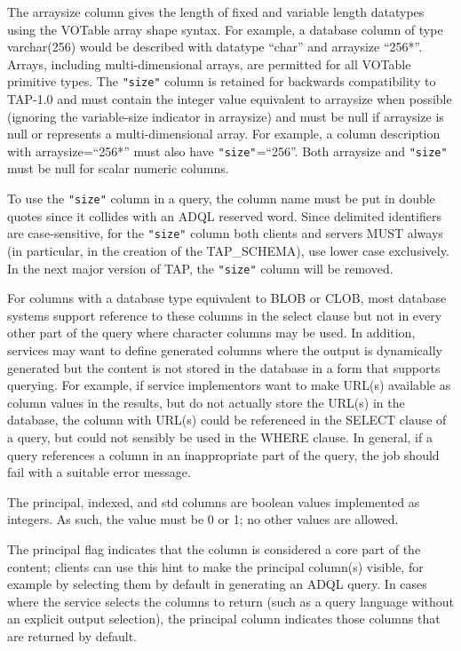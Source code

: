\documentclass[11pt,letter]{ivoa}
\newcommand{\tapschema}{TAP\_SCHE\-MA}
\newcommand{\tapschema}{\mbox{%
  \relsize{-0.5}TAP\discretionary{-}{}{\kern-2pt\_}SCHEMA}}
\begin{document}
The arraysize column gives the length of fixed and variable length datatypes using the VOTable
array shape syntax. For example, a database column of type varchar(256) would be 
described with datatype ``char'' and arraysize ``256*''. Arrays, including multi-dimensional 
arrays, are permitted for all VOTable primitive types. The \verb|"size"| column is retained for backwards
compatibility to TAP-1.0 and must contain the integer value equivalent to arraysize when 
possible (ignoring the variable-size indicator in arraysize) and must be null if arraysize is null or 
represents a multi-dimensional array. For example, a column description with arraysize=``256*'' must also have 
\verb|"size"|=``256''. Both arraysize and \verb|"size"| must be null for scalar numeric columns.

To use the \verb|"size"| column in a query, the column name must be put in double quotes since 
it collides with an ADQL reserved word. Since delimited identifiers are case-sensitive, for the 
\verb|"size"| column both
clients and servers MUST always (in particular, in the creation of the 
\tapschema), use lower case exclusively. In the next major version 
of TAP, the \verb|"size"| column will be removed.

For columns with a database type equivalent to BLOB or CLOB, most database systems support
reference to these columns in the select clause but not in every other part of the query where
character columns may be used. In addition, services may want to define generated columns where the output is dynamically generated but the content is not stored in the 
database in a form that supports querying. For example, if service implementors want to make
URL(s) available as column values in the results, but do not actually store the URL(s) in the
database, the column with URL(s) could be referenced in the SELECT clause of a query, but could
not sensibly be used in the WHERE clause. In general, if a query references a column in an 
inappropriate part of the query, the job should fail with a suitable error message.

The principal, indexed, and std columns are boolean values implemented as integers. As such, 
the value must be 0 or 1; no other values are allowed.

The principal flag indicates that the column is considered a core part of the 
content; clients can use this hint to make the principal column(s) visible, for 
example by selecting them by default in generating an ADQL query. In cases where 
the service selects the columns to return (such as a query language without an 
explicit output selection), the principal column indicates those columns that 
are returned by default. 
\end{document}

